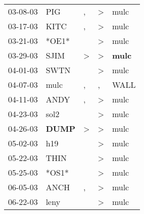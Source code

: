 \begin{supertabular}{p{0.07\textwidth}p{0.06\textwidth}p{0.02\textwidth}p{0.02\textwidth}p{0.06\textwidth}}
          03-08-03\textsuperscript{} &            PIG\textsuperscript{} &                , &     \textgreater &           mulc\textsuperscript{} \\
          03-17-03\textsuperscript{} &           KITC\textsuperscript{} &                , &     \textgreater &           mulc\textsuperscript{} \\
          03-21-03\textsuperscript{} &                            *OE1* &                  &     \textgreater &           mulc\textsuperscript{} \\
          03-29-03\textsuperscript{} &           SJIM\textsuperscript{} &     \textgreater &     \textgreater &  \textbf{mulc\textsuperscript{}} \\
          04-01-03\textsuperscript{} &           SWTN\textsuperscript{} &                  &     \textgreater &           mulc\textsuperscript{} \\
          04-07-03\textsuperscript{} &           mulc\textsuperscript{} &                , &                , &           WALL\textsuperscript{} \\
          04-11-03\textsuperscript{} &           ANDY\textsuperscript{} &                , &     \textgreater &           mulc\textsuperscript{} \\
          04-23-03\textsuperscript{} &           sol2\textsuperscript{} &                  &     \textgreater &           mulc\textsuperscript{} \\
          04-26-03\textsuperscript{} &  \textbf{DUMP\textsuperscript{}} &     \textgreater &     \textgreater &           mulc\textsuperscript{} \\
          05-02-03\textsuperscript{} &            h19\textsuperscript{} &                  &     \textgreater &           mulc\textsuperscript{} \\
          05-22-03\textsuperscript{} &           THIN\textsuperscript{} &                  &     \textgreater &           mulc\textsuperscript{} \\
          05-25-03\textsuperscript{} &                            *OS1* &                  &     \textgreater &           mulc\textsuperscript{} \\
          06-05-03\textsuperscript{} &           ANCH\textsuperscript{} &                , &     \textgreater &           mulc\textsuperscript{} \\
          06-22-03\textsuperscript{} &           leny\textsuperscript{} &                  &     \textgreater &           mulc\textsuperscript{} \\

\end{supertabular}
